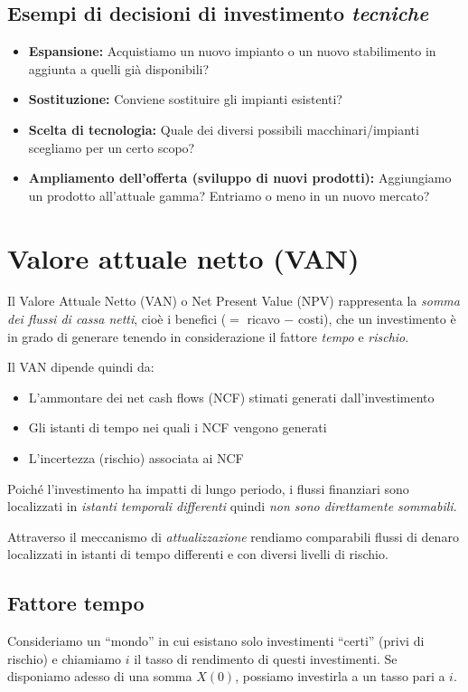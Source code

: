 \subsection{Esempi di decisioni di investimento \emph{tecniche}}
\begin{itemize}
    \item \textbf{Espansione:}
    Acquistiamo un nuovo impianto o un nuovo stabilimento in aggiunta a quelli già disponibili?
    \item \textbf{Sostituzione:}
    Conviene sostituire gli impianti esistenti?
    \item \textbf{Scelta di tecnologia:}
    Quale dei diversi possibili macchinari/impianti scegliamo per un certo scopo?
    \item \textbf{Ampliamento dell’offerta (sviluppo di nuovi prodotti):}
    Aggiungiamo un prodotto all’attuale gamma?
    Entriamo o meno in un nuovo mercato?
\end{itemize}

\section{Valore attuale netto (VAN)}
Il Valore Attuale Netto (\gls{VAN}) o Net Present Value (NPV) rappresenta la
\emph{somma dei flussi di cassa netti}, cioè i benefici ($=$ ricavo $-$ costi), che un investimento
è in grado di generare tenendo in considerazione il fattore \emph{tempo} e \emph{rischio}.

Il \gls{VAN} dipende quindi da:
\begin{itemize}
    \item L’ammontare dei net cash flows (\gls{NCF}) stimati generati dall’investimento
    \item Gli istanti di tempo nei quali i \gls{NCF} vengono generati
    \item L’incertezza (rischio) associata ai \gls{NCF}
\end{itemize}

Poiché l’investimento ha impatti di lungo periodo, i flussi finanziari sono
localizzati in \emph{istanti temporali differenti} quindi \emph{non sono direttamente sommabili}.

Attraverso il meccanismo di \emph{attualizzazione} rendiamo comparabili flussi di denaro
localizzati in istanti di tempo differenti e con diversi livelli di rischio.

\subsection{Fattore tempo}
Consideriamo un ``mondo'' in cui esistano solo investimenti ``certi'' (privi di rischio)
e chiamiamo $i$ il tasso di rendimento di questi investimenti.
Se disponiamo adesso di una somma $X(0)$, possiamo investirla a un tasso pari a $i$.

